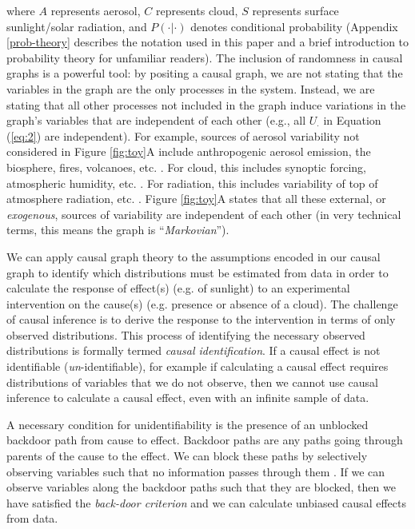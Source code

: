 \documentclass[12pt]{article}
\begin{document}
where $A$ represents aerosol, $C$ represents cloud, $S$ represents
surface sunlight/solar radiation, and $P(\cdot | \cdot)$ denotes
conditional probability (Appendix \ref{prob-theory} describes the
notation used in this paper and a brief introduction to probability
theory for unfamiliar readers). The inclusion of randomness in causal
graphs is a powerful tool: by positing a causal graph, we are not
stating that the variables in the graph are the only processes in the
system. Instead, we are stating that all other processes not included
in the graph induce variations in the graph's variables that are
independent of each other (e.g., all $U_{\cdot}$ in Equation
(\ref{eq:2}) are independent). For example, sources of aerosol
variability not considered in Figure \ref{fig:toy}A include
anthropogenic aerosol emission, the biosphere, fires, volcanoes,
etc. \citep[e.g.,][]{Boucher2015}. For cloud, this includes synoptic
forcing, atmospheric humidity,
etc. \citep[e.g.,][]{wallace2006atmospheric}. For radiation, this
includes variability of top of atmosphere radiation,
etc. \citep[e.g.,][]{hartmann2015global}. Figure \ref{fig:toy}A states
that all these external, or \textit{exogenous}, sources of variability
are independent of each other (in very technical terms, this means the
graph is ``\textit{Markovian}'').

We can apply causal graph theory
\citep[e.g.,][]{pearl1995causal,shpitser2006} to the assumptions
encoded in our causal graph to identify which distributions must be
estimated from data in order to calculate the response of effect(s)
(e.g. of sunlight) to an experimental intervention on the cause(s)
(e.g. presence or absence of a cloud). The challenge of causal
inference is to derive the response to the intervention in terms of
only observed distributions. This process of identifying the necessary
observed distributions is formally termed \emph{causal
  identification}. If a causal effect is not identifiable
(\emph{un}-identifiable), for example if calculating a causal effect
requires distributions of variables that we do not observe, then we
cannot use causal inference to calculate a causal effect, even with an
infinite sample of data.


A necessary condition for unidentifiability is the presence of an
unblocked backdoor path from cause to effect. Backdoor paths are any
paths going through parents of the cause to the effect. We can block
these paths by selectively observing variables such that no
information passes through them \citep{geiger-d-sep}. If we can
observe variables along the backdoor paths such that they are blocked,
then we have satisfied the \emph{back-door criterion}
\citep{pearl2009} and we can calculate unbiased causal effects from
data.
\end{document}

